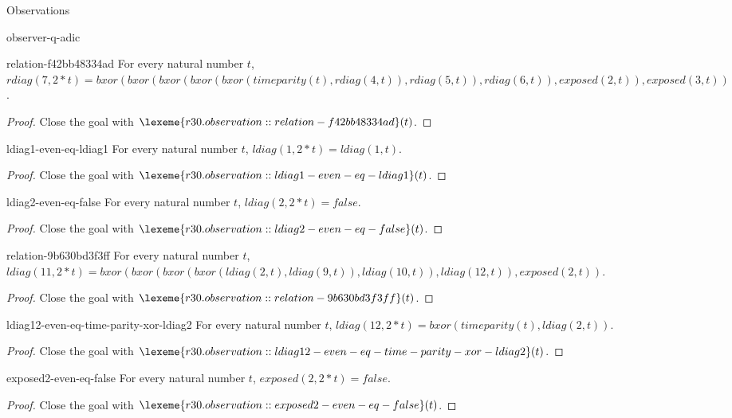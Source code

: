\begin{lexlean}{Observations}
\begin{section}{observer-q-adic}
\begin{theorem}{relation-f42bb48334ad}
For every natural number \(t\), \(rdiag(7, 2 * t) = bxor(bxor(bxor(bxor(bxor(timeparity(t), rdiag(4, t)), rdiag(5, t)), rdiag(6, t)), exposed(2, t)), exposed(3, t))\).
\begin{proof}
Close the goal with \(\lexeme{r30.observation::relation-f42bb48334ad}(t)\).
\end{proof}
\end{theorem}

\begin{theorem}{ldiag1-even-eq-ldiag1}
For every natural number \(t\), \(ldiag(1, 2 * t) = ldiag(1, t)\).
\begin{proof}
Close the goal with \(\lexeme{r30.observation::ldiag1-even-eq-ldiag1}(t)\).
\end{proof}
\end{theorem}

\begin{theorem}{ldiag2-even-eq-false}
For every natural number \(t\), \(ldiag(2, 2 * t) = false\).
\begin{proof}
Close the goal with \(\lexeme{r30.observation::ldiag2-even-eq-false}(t)\).
\end{proof}
\end{theorem}

\begin{theorem}{relation-9b630bd3f3ff}
For every natural number \(t\), \(ldiag(11, 2 * t) = bxor(bxor(bxor(bxor(ldiag(2, t), ldiag(9, t)), ldiag(10, t)), ldiag(12, t)), exposed(2, t))\).
\begin{proof}
Close the goal with \(\lexeme{r30.observation::relation-9b630bd3f3ff}(t)\).
\end{proof}
\end{theorem}

\begin{theorem}{ldiag12-even-eq-time-parity-xor-ldiag2}
For every natural number \(t\), \(ldiag(12, 2 * t) = bxor(timeparity(t), ldiag(2, t))\).
\begin{proof}
Close the goal with \(\lexeme{r30.observation::ldiag12-even-eq-time-parity-xor-ldiag2}(t)\).
\end{proof}
\end{theorem}

\begin{theorem}{exposed2-even-eq-false}
For every natural number \(t\), \(exposed(2, 2 * t) = false\).
\begin{proof}
Close the goal with \(\lexeme{r30.observation::exposed2-even-eq-false}(t)\).
\end{proof}
\end{theorem}


\end{section}
\end{lexlean}
